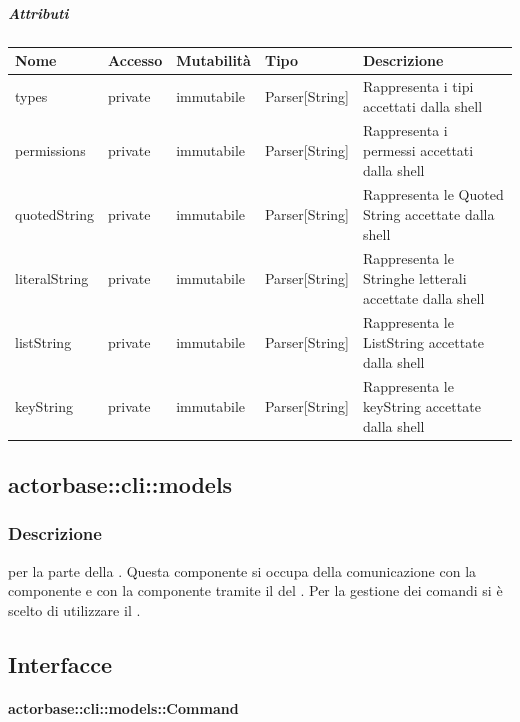 \documentclass{scalatekids-article}
\begin{document}
\subparagraph{Attributi}

\begin{tabular}{| l | l | l | l | l |}
  \hline
  Nome & Accesso & Mutabilità & Tipo & Descrizione\\
  \hline
  types & private & immutabile & Parser[String] & Rappresenta i tipi accettati dalla shell\\
  \hline
  permissions & private & immutabile & Parser[String] & Rappresenta i permessi accettati dalla shell\\
  \hline
  quotedString & private & immutabile & Parser[String] & Rappresenta le Quoted String accettate dalla shell\\
  \hline
  literalString & private & immutabile & Parser[String] & Rappresenta le Stringhe letterali accettate dalla shell\\
  \hline
  listString & private & immutabile & Parser[String] & Rappresenta le ListString accettate dalla shell\\
  \hline
  keyString & private & immutabile & Parser[String] & Rappresenta le keyString accettate dalla shell\\
  \hline
\end{tabular}

\subsection{actorbase::cli::models}
\label{sec:actorbase::cli::models}

\subsubsection{Descrizione}

 per la parte  della . Questa
componente si occupa della comunicazione con la componente  e
con la componente  tramite il  del  . Per la gestione dei comandi si è scelto di
utilizzare il .

\subsection{Interfacce}

\paragraph{actorbase::cli::models::Command}
\label{sec:actorbase::cli::models::Command}
\end{document}
